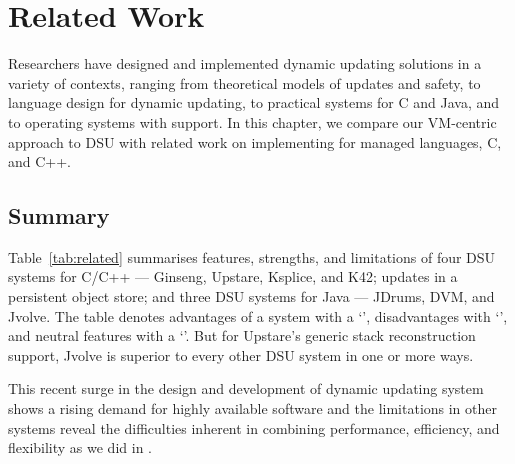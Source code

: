\chapter{Related Work}
\label{chap:related}

Researchers have designed and implemented dynamic updating solutions in a variety of contexts, ranging from
theoretical models of updates and safety, to language design for dynamic
updating, to practical \USD systems for C and Java, and to operating systems
with \USD support. In this chapter, we compare our VM-centric approach to
DSU with related work on implementing \USD for managed languages, C, and
C++.







\section{Summary}
Table~\ref{tab:related} summarises features, strengths, and limitations of four
DSU systems for C/C++ --- Ginseng, Upstare, Ksplice, and K42; updates in a
persistent object store; and three DSU systems for Java --- JDrums, DVM,
and Jvolve. The table denotes advantages of a system with a `\Y',
disadvantages with `\N', and neutral features with a `\Z'.
But for Upstare's generic stack reconstruction support, Jvolve
is superior to every other DSU system in one or more ways.

This recent surge in the design and development of dynamic updating system
shows a rising demand for highly available software and the limitations in
other systems reveal the difficulties inherent in combining performance,
efficiency, and flexibility as we did in \JV.
